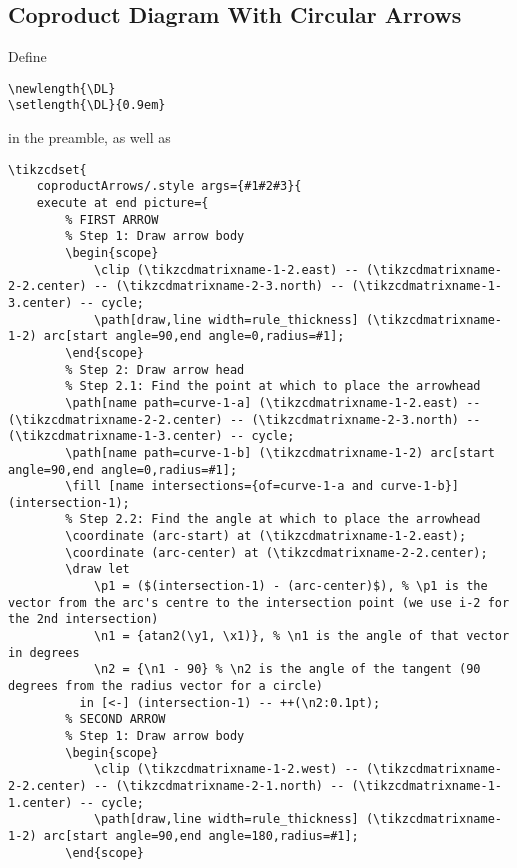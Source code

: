 \subsection{Coproduct Diagram With Circular Arrows}\label{subsection-tikz-code-for-commutative-diagrams-coproduct-diagram-with-circular-arrows}
Define
\begin{verbatim}
\newlength{\DL}
\setlength{\DL}{0.9em}
\end{verbatim}
in the preamble, as well as
\begin{verbatim}
\tikzcdset{
    coproductArrows/.style args={#1#2#3}{
    execute at end picture={
        % FIRST ARROW
        % Step 1: Draw arrow body
        \begin{scope}
            \clip (\tikzcdmatrixname-1-2.east) -- (\tikzcdmatrixname-2-2.center) -- (\tikzcdmatrixname-2-3.north) -- (\tikzcdmatrixname-1-3.center) -- cycle;
            \path[draw,line width=rule_thickness] (\tikzcdmatrixname-1-2) arc[start angle=90,end angle=0,radius=#1];
        \end{scope}
        % Step 2: Draw arrow head
        % Step 2.1: Find the point at which to place the arrowhead
        \path[name path=curve-1-a] (\tikzcdmatrixname-1-2.east) -- (\tikzcdmatrixname-2-2.center) -- (\tikzcdmatrixname-2-3.north) -- (\tikzcdmatrixname-1-3.center) -- cycle;
        \path[name path=curve-1-b] (\tikzcdmatrixname-1-2) arc[start angle=90,end angle=0,radius=#1];
        \fill [name intersections={of=curve-1-a and curve-1-b}] (intersection-1);
        % Step 2.2: Find the angle at which to place the arrowhead
        \coordinate (arc-start) at (\tikzcdmatrixname-1-2.east);
        \coordinate (arc-center) at (\tikzcdmatrixname-2-2.center);
        \draw let
            \p1 = ($(intersection-1) - (arc-center)$), % \p1 is the vector from the arc's centre to the intersection point (we use i-2 for the 2nd intersection)
            \n1 = {atan2(\y1, \x1)}, % \n1 is the angle of that vector in degrees
            \n2 = {\n1 - 90} % \n2 is the angle of the tangent (90 degrees from the radius vector for a circle)
          in [<-] (intersection-1) -- ++(\n2:0.1pt);
        % SECOND ARROW
        % Step 1: Draw arrow body
        \begin{scope}
            \clip (\tikzcdmatrixname-1-2.west) -- (\tikzcdmatrixname-2-2.center) -- (\tikzcdmatrixname-2-1.north) -- (\tikzcdmatrixname-1-1.center) -- cycle;
            \path[draw,line width=rule_thickness] (\tikzcdmatrixname-1-2) arc[start angle=90,end angle=180,radius=#1];
        \end{scope}

\end{verbatim}

